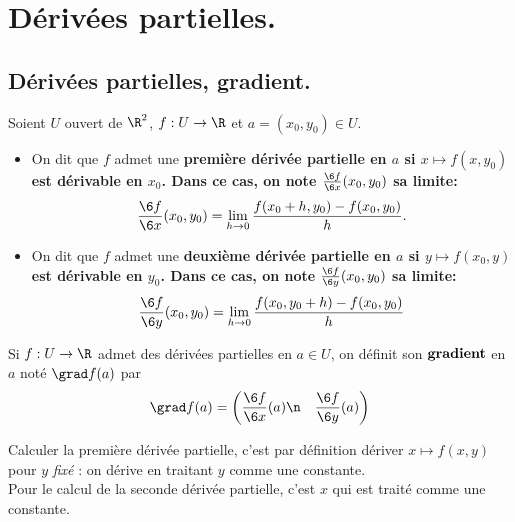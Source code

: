 \documentclass[11pt]{article}
\begin{document}
\section{Dérivées partielles.}

\subsection{Dérivées partielles, gradient.}

\begin{defi}{}{}
    Soient $U$ ouvert de $\R^2$, $f:U\to\R$ et $a=(x_0,y_0)\in U$.
    \begin{itemize}[topsep=0pt,itemsep=-0.9 ex]
        \item On dit que $f$ admet une \bf{première dérivée partielle} en $a$ si $x\mapsto f(x,y_0)$ est dérivable en $x_0$. Dans ce cas, on note $\frac{\6 f}{\6 x}(x_0, y_0)$ sa limite:
        \begin{equation*}
            \frac{\6 f}{\6 x}(x_0,y_0)=\lim_{h\to0}\frac{f(x_0+h,y_0)-f(x_0,y_0)}{h}.
        \end{equation*}
        \item On dit que $f$ admet une \bf{deuxième dérivée partielle} en $a$ si $y\mapsto f(x_0,y)$ est dérivable en $y_0$. Dans ce cas, on note $\frac{\6 f}{\6 y}(x_0,y_0)$ sa limite:
        \begin{equation*}
            \frac{\6 f}{\6 y}(x_0,y_0)=\lim_{h\to 0}\frac{f(x_0,y_0+h)-f(x_0,y_0)}{h}
        \end{equation*}
    \end{itemize}
\end{defi}

\begin{defi}{}{}
    Si $f:U\to\R$ admet des dérivées partielles en $a\in U$, on définit son $\bf{gradient}$ en $a$ noté $\grad f(a)$ par
    \large
    \begin{equation*}
        \grad f(a) = \left(\begin{aligned}
        &\frac{\6 f}{\6 x}(a)\n
        &\frac{\6 f}{\6 y}(a)
        \end{aligned}\right)
    \end{equation*}
\end{defi}

\begin{meth}{}{}
    Calculer la première dérivée partielle, c'est par définition dériver $x\mapsto f(x,y)$ pour $y$ \emph{fixé} : on dérive en traitant $y$ comme une constante.\\
    Pour le calcul de la seconde dérivée partielle, c'est $x$ qui est traité comme une constante.
\end{meth}
\end{document}
